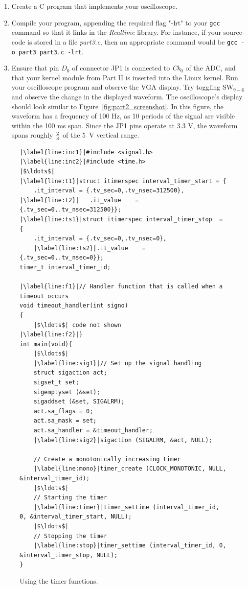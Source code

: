\documentclass[epsfig,10pt,fullpage]{article}
\begin{document}
\begin{enumerate}
\item Create a C program that implements your oscilloscope.

\item Compile your program, appending the required flag "-lrt" to your \texttt{gcc} command 
so that it links in the \textit{Realtime} library. For instance, if your source-code is
stored in a file {\it part3.c}, then an appropriate command would be 
\texttt{gcc -o part3 part3.c -lrt}.

\item Ensure that pin $D_0$ of connector JP1 is connected to {\it Ch}$_0$ of the ADC, and that
your kernel module from Part II is inserted into the Linux kernel. Run your oscilloscope
program and observe the VGA display. Try toggling SW$_{9-6}$ and observe the change in the 
displayed waveform. The oscilloscope's display should look similar to 
Figure~\ref{fig:part2_screenshot}. In this figure, the waveform has a frequency of 100 Hz, 
as 10 periods of the signal are visible within the 100 ms span. Since the JP1 pins operate 
at 3.3 V, the waveform spans roughly $2 \over 3$ of the 5~V vertical range.
\end{enumerate}

\lstset{language=C,numbers=left,escapechar=|}
\begin{figure}[H]
\begin{center}
\begin{minipage}[t]{16 cm}
\begin{lstlisting}
|\label{line:inc1}|#include <signal.h>
|\label{line:inc2}|#include <time.h>
|$\ldots$|
|\label{line:t1}|struct itimerspec interval_timer_start = {
	.it_interval = {.tv_sec=0,.tv_nsec=312500},
|\label{line:t2}|	.it_value    = {.tv_sec=0,.tv_nsec=312500}};
|\label{line:ts1}|struct itimerspec interval_timer_stop  = {
 	.it_interval = {.tv_sec=0,.tv_nsec=0},
	|\label{line:ts2}|.it_value    = {.tv_sec=0,.tv_nsec=0}};
timer_t interval_timer_id;

|\label{line:f1}|// Handler function that is called when a timeout occurs
void timeout_handler(int signo)
{
	|$\ldots$| code not shown 
|\label{line:f2}|}
int main(void){
	|$\ldots$| 
	|\label{line:sig1}|// Set up the signal handling
	struct sigaction act;
	sigset_t set;
	sigemptyset (&set);
	sigaddset (&set, SIGALRM);
	act.sa_flags = 0;
	act.sa_mask = set;
	act.sa_handler = &timeout_handler;
	|\label{line:sig2}|sigaction (SIGALRM, &act, NULL);

	// Create a monotonically increasing timer
	|\label{line:mono}|timer_create (CLOCK_MONOTONIC, NULL, &interval_timer_id);
	|$\ldots$|
	// Starting the timer
	|\label{line:timer}|timer_settime (interval_timer_id, 0, &interval_timer_start, NULL);
	|$\ldots$|
	// Stopping the timer
	|\label{line:stop}|timer_settime (interval_timer_id, 0, &interval_timer_stop, NULL);
}
\end{lstlisting}
\end{minipage}
\end{center}
\vspace{-0.25in}\caption{Using the timer functions.}
\label{fig:timer_code}
\end{figure}
\end{document}
